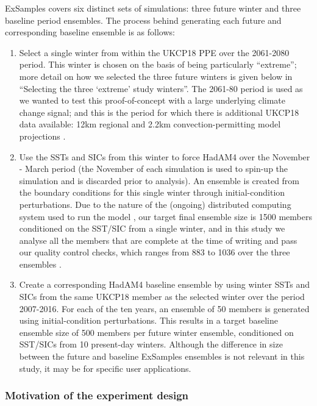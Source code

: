     ExSamples covers six distinct sets of simulations: three future winter and three baseline period ensembles. The process behind generating each future and corresponding baseline ensemble is as follows:

    \begin{enumerate}
      \item Select a single winter from within the UKCP18 PPE over the 2061-2080 period. This winter is chosen on the basis of being particularly ``extreme''; more detail on how we selected the three future winters is given below in ``Selecting the three `extreme' study winters''. The 2061-80 period is used as we wanted to test this proof-of-concept with a large underlying climate change signal; and this is the period for which there is additional UKCP18 data available: 12km regional and 2.2km convection-permitting model projections \citep{kendon_ukcp_2019,murphy_ukcp18_2018}.
      \item Use the SSTs and SICs from this winter to force HadAM4 over the November - March period (the November of each simulation is used to spin-up the simulation and is discarded prior to analysis). An ensemble is created from the boundary conditions for this single winter through initial-condition perturbations. Due to the nature of the (ongoing) distributed computing system used to run the model \citep{allen_-it-yourself_1999,stainforth_uncertainty_2005}, our target final ensemble size is 1500 members conditioned on the SST/SIC from a single winter, and in this study we analyse all the members that are complete at the time of writing and pass our quality control checks, which ranges from 883 to 1036 over the three ensembles \citep{sparrow_exsamples_2021}.
      \item Create a corresponding HadAM4 baseline ensemble by using winter SSTs and SICs from the same UKCP18 member as the selected winter over the period 2007-2016. For each of the ten years, an ensemble of 50 members is generated using initial-condition perturbations. This results in a target baseline ensemble size of 500 members per future winter ensemble, conditioned on SST/SICs from 10 present-day winters. Although the difference in size between the future and baseline ExSamples ensembles is not relevant in this study, it may be for specific user applications.
    \end{enumerate}
  
    \subsubsection{Motivation of the experiment design}

